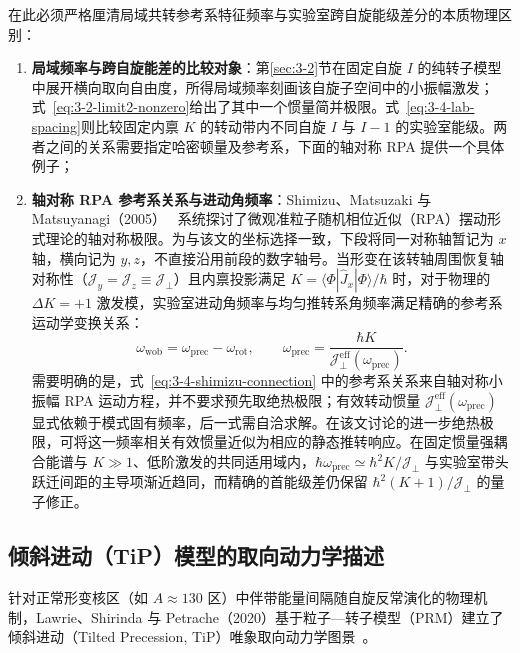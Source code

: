 在此必须严格厘清局域共转参考系特征频率与实验室跨自旋能级差分的本质物理区别：
\begin{enumerate}
\item \textbf{局域频率与跨自旋能差的比较对象}：第\ref{sec:3-2}节在固定自旋 $I$ 的纯转子模型中展开横向取向自由度，所得局域频率刻画该自旋子空间中的小振幅激发；式~\eqref{eq:3-2-limit2-nonzero}给出了其中一个惯量简并极限。式~\eqref{eq:3-4-lab-spacing}则比较固定内禀 $K$ 的转动带内不同自旋 $I$ 与 $I-1$ 的实验室能级。两者之间的关系需要指定哈密顿量及参考系，下面的轴对称 RPA 提供一个具体例子；
\item \textbf{轴对称 RPA 参考系关系与进动角频率}：Shimizu、Matsuzaki 与 Matsuyanagi（2005）~\cite{shimizu-2005-high-k-precession} 系统探讨了微观准粒子随机相位近似（RPA）摆动形式理论的轴对称极限。为与该文的坐标选择一致，下段将同一对称轴暂记为 $x$ 轴，横向记为 $y,z$，不直接沿用前段的数字轴号。当形变在该转轴周围恢复轴对称性（$\mathcal{J}_y = \mathcal{J}_z \equiv \mathcal{J}_\perp$）且内禀投影满足 $K = \langle \Phi | \hat{J}_x | \Phi \rangle / \hbar$ 时，对于物理的 $\Delta K = +1$ 激发模，实验室进动角频率与均匀推转系角频率满足精确的参考系运动学变换关系：
\begin{equation}\label{eq:3-4-shimizu-connection}
\omega_{\text{wob}} = \omega_{\text{prec}} - \omega_{\text{rot}}, \qquad \omega_{\text{prec}} = \frac{\hbar K}{\mathcal{J}_\perp^{\text{eff}}(\omega_{\text{prec}})}.
\end{equation}
需要明确的是，式~\eqref{eq:3-4-shimizu-connection} 中的参考系关系来自轴对称小振幅 RPA 运动方程，并不要求预先取绝热极限；有效转动惯量 $\mathcal{J}_\perp^{\text{eff}}(\omega_{\text{prec}})$ 显式依赖于模式固有频率，后一式需自洽求解。在该文讨论的进一步绝热极限，可将这一频率相关有效惯量近似为相应的静态推转响应。在固定惯量强耦合能谱与 $K \gg 1$、低阶激发的共同适用域内，$\hbar \omega_{\text{prec}} \simeq \hbar^2 K / \mathcal{J}_\perp$ 与实验室带头跃迁间距的主导项渐近趋同，而精确的首能级差仍保留 $\hbar^2(K+1)/\mathcal{J}_\perp$ 的量子修正。
\end{enumerate}

\subsection{倾斜进动（TiP）模型的取向动力学描述}\label{sec:3-4-2}

针对正常形变核区（如 $A \approx 130$ 区）中伴带能量间隔随自旋反常演化的物理机制，Lawrie、Shirinda 与 Petrache（2020）基于粒子—转子模型（PRM）建立了倾斜进动（Tilted Precession, TiP）唯象取向动力学图景~\cite{lawrie-2020-tilted-precession-wobbling}。

